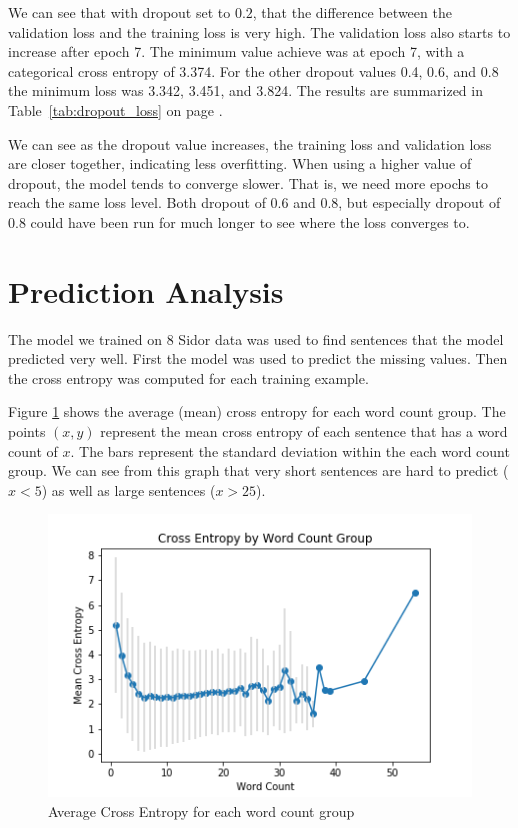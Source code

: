 \documentclass[11pt,a4paper]{article}
\begin{document}
We can see that with dropout set to $0.2$, that the difference between the validation loss and the training loss is very high.
The validation loss also starts to increase after epoch 7.
The minimum value achieve was at epoch 7, with a categorical cross entropy of 3.374.
For the other dropout values 0.4, 0.6, and 0.8 the minimum loss was 3.342, 3.451, and 3.824.
The results are summarized in Table~\ref{tab:dropout_loss} on page \pageref{tab:dropout_loss}.

We can see as the dropout value increases, the training loss and validation loss are closer together, indicating less overfitting.
When using a higher value of dropout, the model tends to converge slower.
That is, we need more epochs to reach the same loss level.
Both dropout of $0.6$ and $0.8$, but especially dropout of $0.8$ could have been run for much longer to see where the loss converges to.

\section{Prediction Analysis}
The model we trained on 8 Sidor data was used to find sentences that the model predicted very well.
First the model was used to predict the missing values.
Then the cross entropy was computed for each training example.

Figure \ref{fig:word_count_entropy} shows the average (mean) cross entropy for each word count group.
The points $(x,y)$ represent the mean cross entropy of each sentence that has a word count of $x$.
The bars represent the standard deviation within the each word count group.
We can see from this graph that very short sentences are hard to predict ($x < 5$) as well as large sentences ($x > 25$).


\begin{figure}[h!]
\centering
\includegraphics[scale=1]{cross_entropy_word_count.png}
\caption{Average Cross Entropy for each word count group}
\label{fig:word_count_entropy}
\end{figure}
\end{document}
